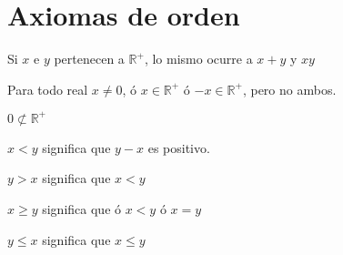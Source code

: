 \section{Axiomas de orden}
\begin{tcolorbox}[colframe=white]
\begin{axioma}Si $x$ e $y$ pertenecen a $\mathbb{R}^+$, lo mismo ocurre a $x+y$ y $xy$\\
\end{axioma}
\begin{axioma}
Para todo real $x\neq 0$, ó $x \in \mathbb{R}^+$ ó $-x \in \mathbb{R}^+$, pero no ambos.\\
\end{axioma}
\begin{axioma}
$0 \not\subset \mathbb{R}^+$\\
\end{axioma}
\end{tcolorbox}

\begin{tcolorbox}[colframe=white]
\begin{def.}
$x<y $ significa que $y-x$ es positivo. \\
\end{def.}
\begin{def.}
$y>x$ significa que $x<y$\\
\end{def.}
\begin{def.}
$x \geq y$ significa que ó $x<y$ ó $x=y$\\
\end{def.}
\begin{def.}
$y \leq x$ significa que $x \leq y$ 
\end{def.}
\end{tcolorbox}

